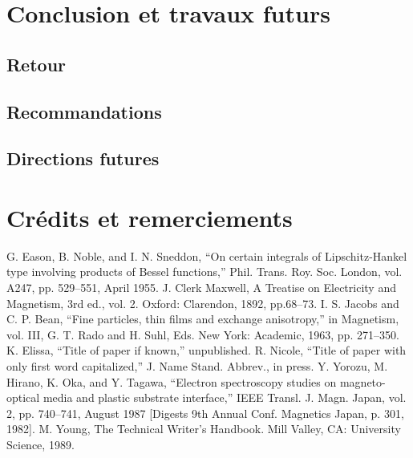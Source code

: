 \documentclass[conference]{IEEEtran}
\begin{document}
\section{Conclusion et travaux futurs}

\subsection{Retour}

\subsection{Recommandations}

\subsection{Directions futures}

\section{Crédits et remerciements}

\begin{thebibliography}{00}
 G. Eason, B. Noble, and I. N. Sneddon, ``On certain integrals of Lipschitz-Hankel type involving products of Bessel functions,'' Phil. Trans. Roy. Soc. London, vol. A247, pp. 529--551, April 1955.
 J. Clerk Maxwell, A Treatise on Electricity and Magnetism, 3rd ed., vol. 2. Oxford: Clarendon, 1892, pp.68--73.
 I. S. Jacobs and C. P. Bean, ``Fine particles, thin films and exchange anisotropy,'' in Magnetism, vol. III, G. T. Rado and H. Suhl, Eds. New York: Academic, 1963, pp. 271--350.
 K. Elissa, ``Title of paper if known,'' unpublished.
 R. Nicole, ``Title of paper with only first word capitalized,'' J. Name Stand. Abbrev., in press.
 Y. Yorozu, M. Hirano, K. Oka, and Y. Tagawa, ``Electron spectroscopy studies on magneto-optical media and plastic substrate interface,'' IEEE Transl. J. Magn. Japan, vol. 2, pp. 740--741, August 1987 [Digests 9th Annual Conf. Magnetics Japan, p. 301, 1982].
 M. Young, The Technical Writer's Handbook. Mill Valley, CA: University Science, 1989.
\end{thebibliography}
\end{document}
